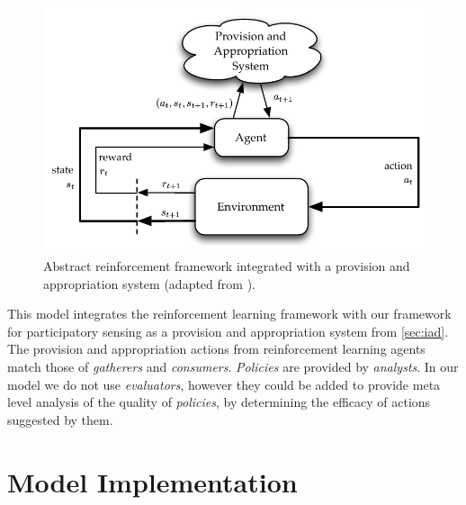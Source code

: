 \begin{figure}
\centering
\includegraphics{gfx/reinforcementlearning}
\caption[Abstract reinforcement framework integrated with a provision and appropriation system]{Abstract reinforcement framework integrated with a provision and appropriation system (adapted from \citet[p.52]{Sutton1998}).}\label{fig:reinflearn}
\end{figure}

This model integrates the reinforcement learning framework with our framework
for participatory sensing as a provision and appropriation system from
\autoref{sec:iad}. The provision and appropriation actions from reinforcement
learning agents match those of \emph{gatherers} and \emph{consumers}.
\emph{Policies} are provided by \emph{analysts}. In our model we do not use
\emph{evaluators}, however they could be added to provide meta level analysis
of the quality of \emph{policies}, by determining the efficacy of actions
suggested by them.



\section{Model Implementation}

